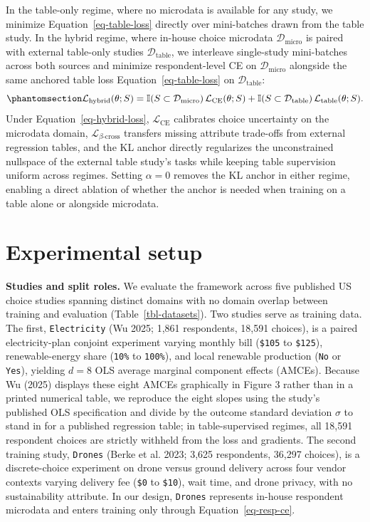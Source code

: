 \documentclass[
  11pt,
  letterpaper,
]{article}
\begin{document}
In the table-only regime, where no microdata is available for any study,
we minimize Equation~\ref{eq-table-loss} directly over mini-batches
drawn from the table study. In the hybrid regime, where in-house choice
microdata \(\mathcal{D}_{\mathrm{micro}}\) is paired with external
table-only studies \(\mathcal{D}_{\mathrm{table}}\), we interleave
single-study mini-batches across both sources and minimize
respondent-level CE on \(\mathcal{D}_{\mathrm{micro}}\) alongside the
same anchored table loss Equation~\ref{eq-table-loss} on
\(\mathcal{D}_{\mathrm{table}}\):
\begin{equation}\protect\phantomsection\label{eq-hybrid-loss}{
\mathcal{L}_{\mathrm{hybrid}}(\theta; S) = \mathbb{I}(S \subset \mathcal{D}_{\mathrm{micro}}) \, \mathcal{L}_{\mathrm{CE}}(\theta; S) + \mathbb{I}(S \subset \mathcal{D}_{\mathrm{table}}) \, \mathcal{L}_{\mathrm{table}}(\theta; S).
}\end{equation} Under Equation~\ref{eq-hybrid-loss},
\(\mathcal{L}_{\mathrm{CE}}\) calibrates choice uncertainty on the
microdata domain, \(\mathcal{L}_{\beta\text{-cross}}\) transfers missing
attribute trade-offs from external regression tables, and the KL anchor
directly regularizes the unconstrained nullspace of the external table
study's tasks while keeping table supervision uniform across regimes.
Setting \(\alpha = 0\) removes the KL anchor in either regime, enabling
a direct ablation of whether the anchor is needed when training on a
table alone or alongside microdata.

\section{Experimental setup}\label{sec-setup}

\textbf{Studies and split roles.} We evaluate the framework across five
published US choice studies spanning distinct domains with no domain
overlap between training and evaluation (Table~\ref{tbl-datasets}). Two
studies serve as training data. The first, \texttt{Electricity} (Wu
2025; 1,861 respondents, 18,591 choices), is a paired electricity-plan
conjoint experiment varying monthly bill (\texttt{\$105} to
\texttt{\$125}), renewable-energy share (\texttt{10\%} to
\texttt{100\%}), and local renewable production (\texttt{No} or
\texttt{Yes}), yielding \(d = 8\) OLS average marginal component effects
(AMCEs). Because Wu (2025) displays these eight AMCEs graphically in
Figure 3 rather than in a printed numerical table, we reproduce the
eight slopes using the study's published OLS specification and divide by
the outcome standard deviation \(\sigma\) to stand in for a published
regression table; in table-supervised regimes, all 18,591 respondent
choices are strictly withheld from the loss and gradients. The second
training study, \texttt{Drones} (Berke et al. 2023; 3,625 respondents,
36,297 choices), is a discrete-choice experiment on drone versus ground
delivery across four vendor contexts varying delivery fee (\texttt{\$0}
to \texttt{\$10}), wait time, and drone privacy, with no sustainability
attribute. In our design, \texttt{Drones} represents in-house respondent
microdata and enters training only through Equation~\ref{eq-resp-ce}.
\end{document}
